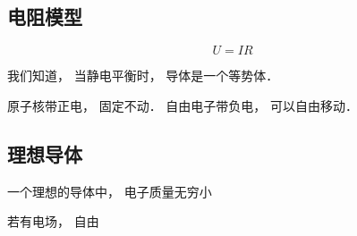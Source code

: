 

\subsection{电阻模型}
\begin{equation}
U = IR
\end{equation}



我们知道， 当静电平衡时， 导体是一个等势体．

原子核带正电， 固定不动． 自由电子带负电， 可以自由移动．

\subsection{理想导体}

一个理想的导体中， 电子质量无穷小

若有电场， 自由
